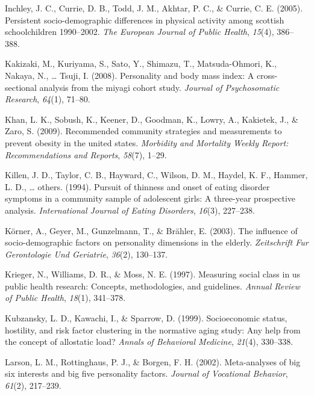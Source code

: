 \documentclass[man]{apa6}
\begin{document}
\leavevmode\hypertarget{ref-inchley2005persistent}{}%
Inchley, J. C., Currie, D. B., Todd, J. M., Akhtar, P. C., \& Currie, C. E. (2005). Persistent socio-demographic differences in physical activity among scottish schoolchildren 1990--2002. \emph{The European Journal of Public Health}, \emph{15}(4), 386--388.

\leavevmode\hypertarget{ref-kakizaki2008personality}{}%
Kakizaki, M., Kuriyama, S., Sato, Y., Shimazu, T., Matsuda-Ohmori, K., Nakaya, N., \ldots{} Tsuji, I. (2008). Personality and body mass index: A cross-sectional analysis from the miyagi cohort study. \emph{Journal of Psychosomatic Research}, \emph{64}(1), 71--80.

\leavevmode\hypertarget{ref-khan2009recommended}{}%
Khan, L. K., Sobush, K., Keener, D., Goodman, K., Lowry, A., Kakietek, J., \& Zaro, S. (2009). Recommended community strategies and measurements to prevent obesity in the united states. \emph{Morbidity and Mortality Weekly Report: Recommendations and Reports}, \emph{58}(7), 1--29.

\leavevmode\hypertarget{ref-killen1994pursuit}{}%
Killen, J. D., Taylor, C. B., Hayward, C., Wilson, D. M., Haydel, K. F., Hammer, L. D., \ldots{} others. (1994). Pursuit of thinness and onset of eating disorder symptoms in a community sample of adolescent girls: A three-year prospective analysis. \emph{International Journal of Eating Disorders}, \emph{16}(3), 227--238.

\leavevmode\hypertarget{ref-korner2003influence}{}%
Körner, A., Geyer, M., Gunzelmann, T., \& Brähler, E. (2003). The influence of socio-demographic factors on personality dimensions in the elderly. \emph{Zeitschrift Fur Gerontologie Und Geriatrie}, \emph{36}(2), 130--137.

\leavevmode\hypertarget{ref-krieger1997measuring}{}%
Krieger, N., Williams, D. R., \& Moss, N. E. (1997). Measuring social class in us public health research: Concepts, methodologies, and guidelines. \emph{Annual Review of Public Health}, \emph{18}(1), 341--378.

\leavevmode\hypertarget{ref-kubzansky1999socioeconomic}{}%
Kubzansky, L. D., Kawachi, I., \& Sparrow, D. (1999). Socioeconomic status, hostility, and risk factor clustering in the normative aging study: Any help from the concept of allostatic load? \emph{Annals of Behavioral Medicine}, \emph{21}(4), 330--338.

\leavevmode\hypertarget{ref-larson2002meta}{}%
Larson, L. M., Rottinghaus, P. J., \& Borgen, F. H. (2002). Meta-analyses of big six interests and big five personality factors. \emph{Journal of Vocational Behavior}, \emph{61}(2), 217--239.
\end{document}
